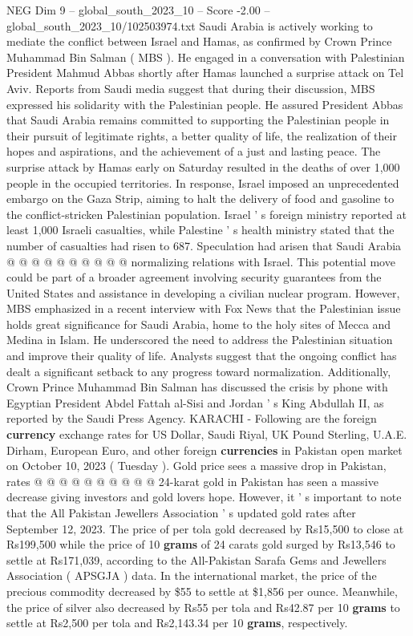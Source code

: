 \begin{textsample}{NEG Dim 9 – global\_south\_2023\_10 – Score -2.00 – global\_south\_2023\_10/102503974.txt}  \label{ex:f9_neg_424}
Saudi Arabia is actively working to mediate the conflict between Israel and Hamas, as confirmed by Crown Prince Muhammad Bin Salman ( MBS ).
He engaged in a conversation with Palestinian President Mahmud Abbas shortly after Hamas launched a surprise attack on Tel Aviv.
Reports from Saudi media suggest that during their discussion, MBS expressed his solidarity with the Palestinian people.
He assured President Abbas that Saudi Arabia remains committed to supporting the Palestinian people in their pursuit of legitimate rights, a better quality of life, the realization of their hopes and aspirations, and the achievement of a just and lasting peace.
The surprise attack by Hamas early on Saturday resulted in the deaths of over 1,000 people in the occupied territories.
In response, Israel imposed an unprecedented embargo on the Gaza Strip, aiming to halt the delivery of food and gasoline to the conflict-stricken Palestinian population.
Israel ' s foreign ministry reported at least 1,000 Israeli casualties, while Palestine ' s health ministry stated that the number of casualties had risen to 687.
Speculation had arisen that Saudi Arabia @ @ @ @ @ @ @ @ @ @ normalizing relations with Israel.
This potential move could be part of a broader agreement involving security guarantees from the United States and assistance in developing a civilian nuclear program.
However, MBS emphasized in a recent interview with Fox News that the Palestinian issue holds great significance for Saudi Arabia, home to the holy sites of Mecca and Medina in Islam.
He underscored the need to address the Palestinian situation and improve their quality of life.
Analysts suggest that the ongoing conflict has dealt a significant setback to any progress toward normalization.
Additionally, Crown Prince Muhammad Bin Salman has discussed the crisis by phone with Egyptian President Abdel Fattah al-Sisi and Jordan ' s King Abdullah II, as reported by the Saudi Press Agency.
KARACHI - Following are the foreign \textbf{currency} exchange rates for US Dollar, Saudi Riyal, UK Pound Sterling, U.A.E.
Dirham, European Euro, and other foreign \textbf{currencies} in Pakistan open market on October 10, 2023 ( Tuesday ).
Gold price sees a massive drop in Pakistan, rates @ @ @ @ @ @ @ @ @ @ 24-karat gold in Pakistan has seen a massive decrease giving investors and gold lovers hope.
However, it ' s important to note that the All Pakistan Jewellers Association ' s updated gold rates after September 12, 2023.
The price of per tola gold decreased by Rs15,500 to close at Rs199,500 while the price of 10 \textbf{grams} of 24 carats gold surged by Rs13,546 to settle at Rs171,039, according to the All-Pakistan Sarafa Gems and Jewellers Association ( APSGJA ) data.
In the international market, the price of the precious commodity decreased by \$55 to settle at \$1,856 per ounce.
Meanwhile, the price of silver also decreased by Rs55 per tola and Rs42.87 per 10 \textbf{grams} to settle at Rs2,500 per tola and Rs2,143.34 per 10 \textbf{grams}, respectively.

\end{textsample}

